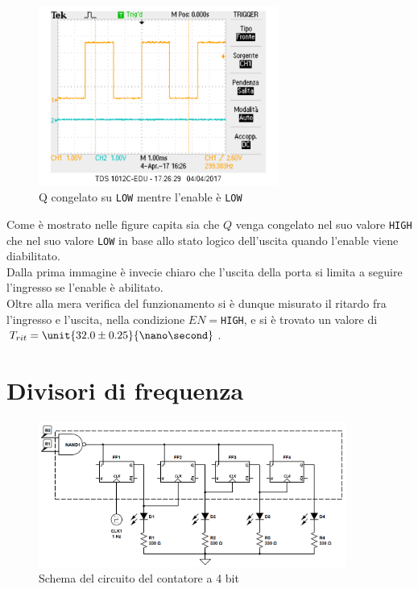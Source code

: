 \documentclass[a4paper,10pt]{article}
\def\code#1{\texttt{#1}}
\begin{document}
\begin{figure}[H]
	\centering
	\includegraphics[width=0.7\textwidth]{../grafici/EnableDown1.png}
	\caption{Q congelato su \code{LOW} mentre l'enable è \code{LOW}}
	\label{fig:FFD}
\end{figure}

Come è mostrato nelle figure capita sia che $Q$ venga congelato nel suo valore \code{HIGH} che nel suo valore \code{LOW} in base allo stato logico dell'uscita quando l'enable viene diabilitato.\\
Dalla prima immagine è invecie chiaro che l'uscita della porta si limita a seguire l'ingresso se l'enable è abilitato.\\
Oltre alla mera verifica del funzionamento si è dunque misurato il ritardo fra l'ingresso e l'uscita, nella condizione $EN=$\code{HIGH}, e si è trovato un valore di $T_{rit}=\unit{32.0\pm 0.25 }{\nano\second}$.





\section{Divisori di frequenza}

\begin{figure}[H]
	\centering
	\includegraphics[width=0.9\textwidth]{../grafici/counterScheme.png}
	\caption{Schema del circuito del contatore a 4 bit}
	\label{fig:counter}
\end{figure}
\end{document}
